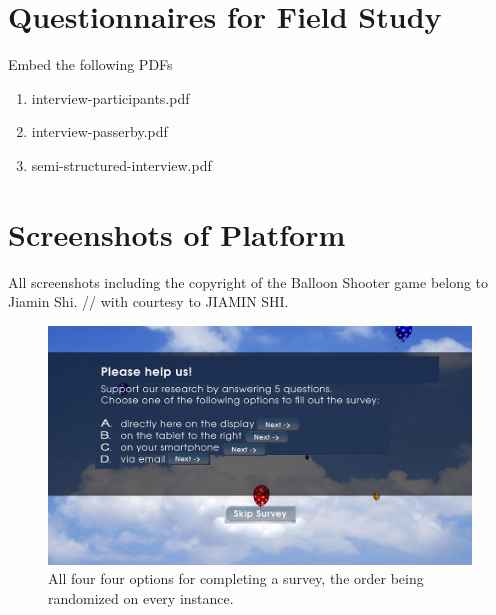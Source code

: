 \section{Questionnaires for Field Study}
\label{appendix:interviews}

  Embed the following PDFs

  \begin{enumerate}
  \item interview-participants.pdf \label{appendix:interview-participant}
  \item interview-passerby.pdf \label{appendix:interview-passerby}
  \item semi-structured-interview.pdf \label{appendix:semi-structured-interview}
  \end{enumerate}




\section{Screenshots of Platform}
\label{appendix:screenshots-balloon-shooter}

    All screenshots including the copyright of the Balloon Shooter game belong to Jiamin Shi.  // with courtesy to JIAMIN SHI.
    
    \begin{figure}
        \begin{center}
            \includegraphics[width=\columnwidth]{img/screenshots/options-overview.jpg}
        \end{center}
     \caption{All four four options for completing a survey, the order being randomized on every instance.}
     \label{screenshot:options}
    \end{figure}


